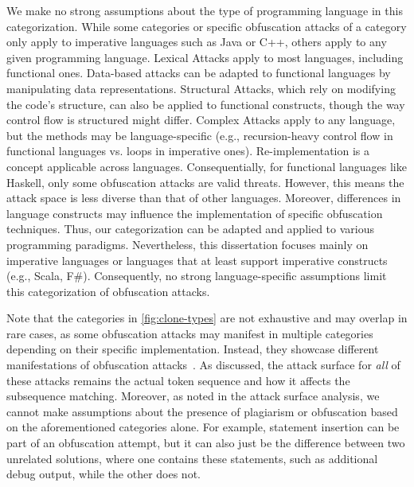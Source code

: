 We make no strong assumptions about the type of programming language in this categorization. While some categories or specific obfuscation attacks of a category only apply to imperative languages such as Java or C++, others apply to any given programming language.
%
Lexical Attacks apply to most languages, including functional ones.
Data-based attacks can be adapted to functional languages by manipulating data representations.
Structural Attacks, which rely on modifying the code's structure, can also be applied to functional constructs, though the way control flow is structured might differ.
Complex Attacks apply to any language, but the methods may be language-specific (e.g., recursion-heavy control flow in functional languages vs. loops in imperative ones).
Re-implementation is a concept applicable across languages.
%
Consequentially, for functional languages like Haskell, only some obfuscation attacks are valid threats. However, this means the attack space is less diverse than that of other languages. Moreover, differences in language constructs may influence the implementation of specific obfuscation techniques.
Thus, our categorization can be adapted and applied to various programming paradigms. Nevertheless, this dissertation focuses mainly on imperative languages or languages that at least support imperative constructs (e.g., Scala, F\#).
%
Consequently, no strong language-specific assumptions limit this categorization of obfuscation attacks.

Note that the categories in \autoref{fig:clone-types} are not exhaustive and may overlap in rare cases, as some obfuscation attacks may manifest in multiple categories depending on their specific implementation. Instead, they showcase different manifestations of obfuscation attacks~\cite{Novak2019, Karnalim2016}. As discussed, the attack surface for \textit{all} of these attacks remains the actual token sequence and how it affects the subsequence matching.
Moreover, as noted in the attack surface analysis, we cannot make assumptions about the presence of plagiarism or obfuscation based on the aforementioned categories alone. For example, statement insertion can be part of an obfuscation attempt, but it can also just be the difference between two unrelated solutions, where one contains these statements, such as additional debug output, while the other does not.

